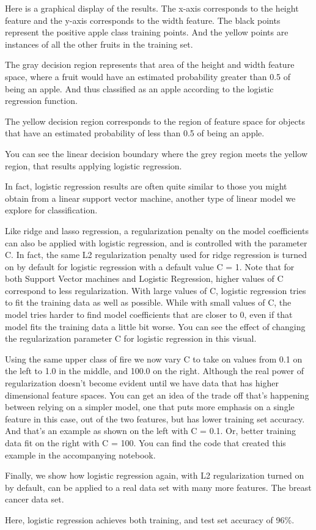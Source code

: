 \begin{multicols}{2}
Here is a graphical display of the results. The x-axis corresponds to the height feature and the y-axis corresponds to the width feature. The black points represent the positive apple class training points. And the yellow points are instances of all the other fruits in the training set. 

The gray decision region represents that area of the height and width feature space, where a fruit would have an estimated probability greater than 0.5 of being an apple. And thus classified as an apple according to the logistic regression function. 

The yellow decision region corresponds to the region of feature space for objects that have an estimated probability of less than 0.5 of being an apple. 

You can see the linear decision boundary where the grey region meets the yellow region, that results applying logistic regression. 

In fact, logistic regression results are often quite similar to those you might obtain from a linear support vector machine, another type of linear model we explore for classification. 

Like ridge and lasso regression, a regularization penalty on the model coefficients can also be applied with logistic regression, and is controlled with the parameter C. In fact, the same L2 regularization penalty used for ridge regression is turned on by default for logistic regression with a default value C = 1. Note that for both Support Vector machines and Logistic Regression, higher values of C correspond to less regularization. With large values of C, logistic regression tries to fit the training data as well as possible. While with small values of C, the model tries harder to find model coefficients that are closer to 0, even if that model fits the training data a little bit worse. You can see the effect of changing the regularization parameter C for logistic regression in this visual. 

Using the same upper class of fire we now vary C to take on values from 0.1 on the left to 1.0 in the middle, and 100.0 on the right. Although the real power of regularization doesn't become evident until we have data that has higher dimensional feature spaces. You can get an idea of the trade off that's happening between relying on a simpler model, one that puts more emphasis on a single feature in this case, out of the two features, but has lower training set accuracy. And that's an example as shown on the left with C = 0.1. Or, better training data fit on the right with C = 100. You can find the code that created this example in the accompanying notebook. 

Finally, we show how logistic regression again, with L2 regularization turned on by default, can be applied to a real data set with many more features. The breast cancer data set. 

Here, logistic regression achieves both training, and test set accuracy of 96\%.
\end{multicols}